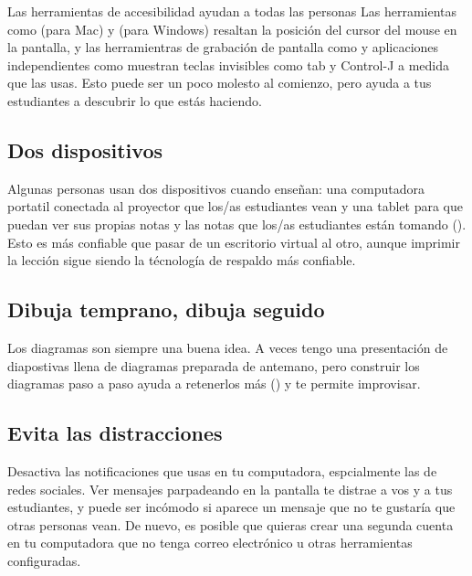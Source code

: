 \begin{aside}{Las herramientas de accesibilidad ayudan a todas las personas}
  Las herramientas como  (para Mac)
  y  (para Windows)
  resaltan la posición del cursor del mouse en la pantalla,
  y las herramientras de grabación de pantalla como 
  y aplicaciones independientes como 
  muestran teclas invisibles como tab y Control-J a medida que las usas.
  Esto puede ser un poco molesto al comienzo,
  pero ayuda a tus estudiantes a descubrir lo que estás haciendo.
\end{aside}

\subsection*{Dos dispositivos}

Algunas personas usan dos dispositivos cuando enseñan:
una computadora portatil conectada al proyector que los/as estudiantes vean
y una tablet para que puedan ver sus propias notas y las notas que los/as estudiantes están tomando ().
Esto es más confiable que pasar de un escritorio virtual al otro, 
aunque imprimir la lección sigue siendo la técnología de respaldo más confiable.

\subsection*{Dibuja temprano, dibuja seguido}

Los diagramas son siempre una buena idea.
A veces tengo una presentación de diapostivas llena de diagramas preparada de antemano,
pero construir los diagramas paso a paso ayuda a retenerlos más ()
y te permite improvisar.

\subsection*{Evita las distracciones}

Desactiva las notificaciones que usas en tu computadora,
espcialmente las de redes sociales.
Ver mensajes parpadeando en la pantalla te distrae a vos y a tus estudiantes,
y puede ser incómodo si aparece un mensaje que no te gustaría que otras personas vean.
De nuevo,
es posible que quieras crear una segunda cuenta en tu computadora que no tenga correo electrónico u otras herramientas configuradas.

